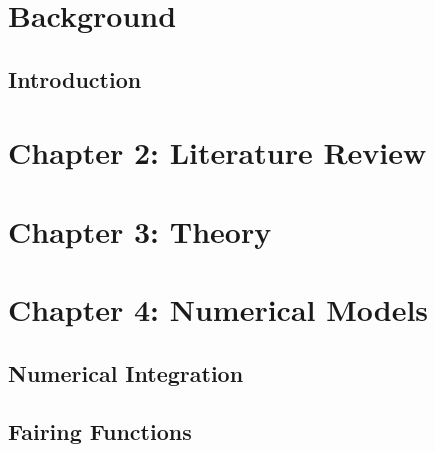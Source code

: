 \documentclass[12pt]{uthesis-v12}  %
\begin{document}
\chapter{Background}
\section{Introduction}

\chapter{Chapter 2: Literature Review}




\chapter{Chapter 3: Theory}




\chapter{Chapter 4: Numerical Models}
\section{Numerical Integration}



%

\section{Fairing Functions}






\end{document}
